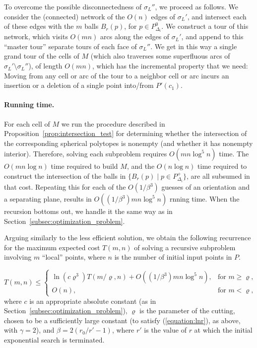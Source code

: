 \documentclass[a4paper,12pt]{article}
\begin{document}
To overcome the possible disconnectedness of $\sigma_L''$, we
proceed as follows. We consider the (connected) network of the
$O(n)$ edges of $\sigma_L'$, and intersect each of these edges with
the $m$ balls $B_r(p)$, for $p \in P_{\Delta_i}^0$. We construct a
tour of this network, which visits $O(mn)$ arcs along the edges of
$\sigma_L'$, and append to this ``master tour'' separate tours of
each face of $\sigma_L''$. We get in this way a single grand tour of
the cells of $M$ (which also traverses some superfluous arcs of
$\sigma_L' \setminus \sigma_L''$), of length $O(mn)$, which has the
incremental property that we need: Moving from any cell or arc of
the tour to a neighbor cell or arc incurs an insertion or a deletion
of a single point into/from $P'(c_1)$.


\paragraph{Running time.}
For each cell of $M$ we run the procedure described in
Proposition~\ref{prop:intersection_test} for determining whether the
intersection of the corresponding spherical polytopes is nonempty
(and whether it has nonempty interior). Therefore, solving each
subproblem requires $O(m n \log^5 n)$ time. The $O(m n \log n)$ time
required to build $M$, and the $O(n \log n)$ time required to
construct the intersection of the balls in $\{B_r(p) \mid p \in
P_{\Delta_i}^+\}$, are all subsumed in that cost. Repeating this for
each of the $O(1/\beta^3)$ guesses of an orientation and a
separating plane, results in $O\left((1/\beta^3) mn \log^5 n\right)$
rnning time. When the recursion bottoms out, we handle it the same
way as in Section~\ref{subsec:optimization_problem}.

Arguing similarly to the less efficient solution, we obtain the
following recurrence for the maximum expected cost $T(m, n)$ of
solving a recursive subproblem involving $m$ ``local'' points, where
$n$ is the number of initial input points in $P$.

\begin{equation}
\label{eqn:T(m,n)_2} T(m,n) \leq \left\{ \begin{array}{ll}
\ln(c\varrho^3)T(m/\varrho,n) + O\left((1/\beta^3) m n \log^5 n\right),   & \mbox{for $m \geq \varrho$,}\\
O(n),                                        & \mbox{for $m <
\varrho$,}
\end{array}\right.
\end{equation}
where $c$ is an appropriate absolute constant (as in
Section~\ref{subsec:optimization_problem}), $\varrho$ is the
parameter of the cutting, chosen to be a sufficiently large constant
(to satisfy (\ref{equation:lnr}), as above, with $\gamma = 2$), and
$\beta = 2\left(r_0/r'-1\right)$, where $r'$ is the value of $r$ at
which the initial exponential search is terminated.
\end{document}
